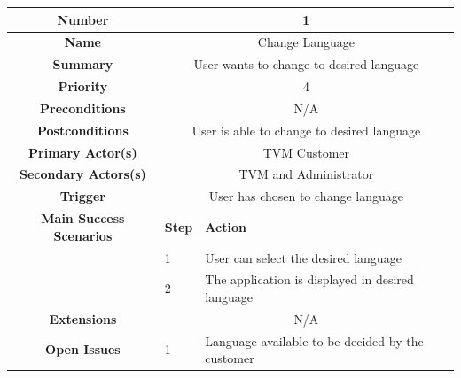\documentclass[a4paper,12pt]{report}
\begin{document}
\begin{tabular}{ | c | p{2cm} | p{7cm} |}
	
	\hline
	\textbf{Number} & \multicolumn{2}{c|}{1}  \\
	\hline
	\textbf{Name} & \multicolumn{2}{c|}{Change Language}  \\
	\hline
	\textbf{Summary} & \multicolumn{2}{c|}{User wants to change to desired language }  \\
	\hline
	\textbf{Priority} & \multicolumn{2}{c|}{4}  \\
	\hline
	\textbf{Preconditions} & \multicolumn{2}{c|}{N/A}  \\
	\hline
	\textbf{Postconditions} & \multicolumn{2}{c|}{User is able to change to desired language}  \\
	\hline
	\textbf{Primary Actor(s)} & \multicolumn{2}{c|}{TVM Customer}  \\
	\hline
	\textbf{Secondary Actors(s)} & \multicolumn{2}{c|}{TVM and Administrator}  \\
	\hline
	\textbf{Trigger} & \multicolumn{2}{c|}{User has chosen to change language}  \\
	\hline
	\textbf{Main Success Scenarios} & \textbf{Step} & \textbf{Action} \\
	\hline
	  & 1 & User can select the desired language \\ 
	\hline
	  &  2  & The application is displayed in desired language \\
	\hline
	\textbf{Extensions} & \multicolumn{2}{c|}{N/A}  \\
	\hline
	\textbf{Open Issues} &  1  & Language available to be decided by the customer \\
	\hline
	
\end{tabular}
\end{document}
